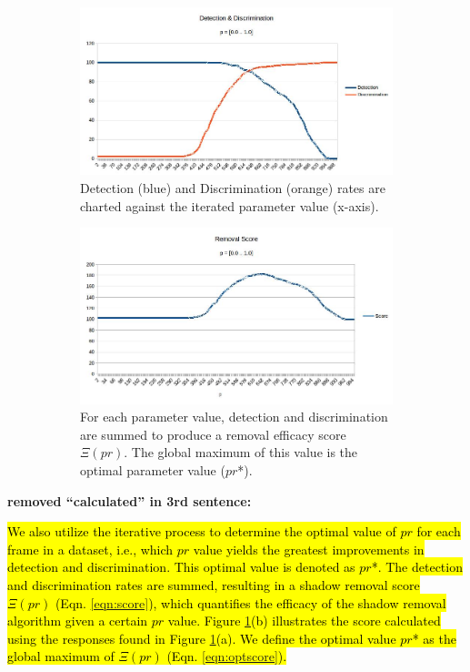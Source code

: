 \documentclass[12pt]{report}
\newcommand{\comment}[1]
           {\par {\bfseries \color{blue} #1 \par}}
\begin{document}
\begin{figure}
  \centering
  \begin{subfigure}{1\linewidth}
  	\includegraphics[width=1\linewidth]{figures/campus_dd.jpg}
  \caption{Detection (blue) and Discrimination (orange) rates are charted against the iterated parameter value (x-axis).}
  \end{subfigure}
  \hfill
  \begin{subfigure}{1\linewidth}
  	\includegraphics[width=1\linewidth]{figures/campus_score.jpg}
  \caption{For each parameter value, detection and discrimination are summed to produce a removal efficacy score $\Xi(pr)$. The global maximum of this value is the optimal parameter value ($pr$*).}
  \end{subfigure}
\caption{}
\label{fig:campusddscore}
\end{figure}

\comment{removed ``calculated'' in 3rd sentence:}
\hl{We also utilize the iterative process to determine the optimal value of $pr$ for each frame in a dataset, i.e., which $pr$ value yields the greatest improvements in detection and discrimination. This optimal value is denoted as $pr$*. The detection and discrimination rates are summed, resulting in a shadow removal score $\Xi(pr)$ (Eqn. \ref{eqn:score}), which quantifies the efficacy of the shadow removal algorithm given a certain $pr$ value. Figure \ref{fig:campusddscore}(b) illustrates the score calculated using the responses found in Figure \ref{fig:campusddscore}(a). We define the optimal value $pr$* as the global maximum of $\Xi(pr)$ (Eqn. \ref{eqn:optscore}).}
\end{document}
